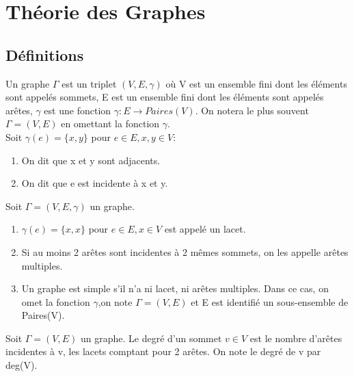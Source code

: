 

\section{Théorie des Graphes}

\subsection{Définitions}

\begin{defn}
Un graphe $\Gamma$ est un triplet $(V,E,\gamma)$ où V est un ensemble fini dont les éléments sont appelés sommets, E est un ensemble fini dont les éléments sont appelés arêtes, $\gamma$ est une fonction $\gamma : E \rightarrow Paires(V)$. On notera le plus souvent $\Gamma = (V,E)$ en omettant la fonction $\gamma$.\\

Soit $\gamma(e) = \{x,y\}$ pour $e \in E, x,y \in V$:
\begin{enumerate}
	\item On dit que x et y sont adjacents.

	\item On dit que e est incidente à x et y. \\
\end{enumerate}

\end{defn}

\begin{defn}
Soit $\Gamma = (V,E,\gamma)$ un graphe.

\begin{enumerate}
	\item $\gamma(e)= \{x,x\}$ pour $e \in E, x \in V$ est appelé un lacet.
	\item Si au moins 2 arêtes sont incidentes à 2 mêmes sommets, on les appelle arêtes multiples.
	\item Un graphe est simple s'il n'a ni lacet, ni arêtes multiples. Dans ce cas, on omet la fonction $\gamma$,on note $\Gamma = (V,E)$ et E est identifié un sous-ensemble de Paires(V). \\
\end{enumerate}
\end{defn}

\begin{defn}
Soit $\Gamma = (V,E)$ un graphe. Le degré d'un sommet $v \in V$ est le nombre d'arêtes incidentes à v, les lacets comptant pour 2 arêtes. On note le degré de v par deg(V).
\end{defn}

